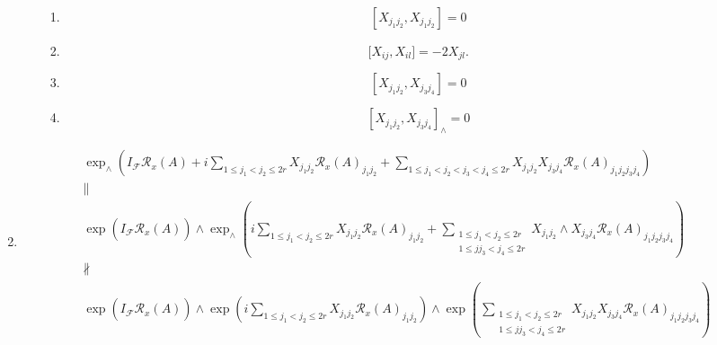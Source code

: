 \documentclass[aps,preprint]{revtex4}%
\begin{document}
\begin{enumerate}
\begin{enumerate}
\begin{enumerate}
\item
\[
\left[  X_{j_{1}j_{2}},X_{j_{1}j_{2}}\right]  =0
\]


\item
\begin{equation}
\lbrack X_{ij}{},X_{il{}}]=-2X_{jl}{}.
\end{equation}


\item
\[
\left[  X_{j_{1}j_{2}},X_{j_{3}j_{4}}\right]  =0
\]


\item
\[
\left[  X_{j_{1}j_{2}},X_{j_{3}j_{4}}\right]  _{\wedge}=0
\]

\end{enumerate}
\end{enumerate}

\item
\begin{gather}
\exp_{\wedge}\left(  I_{\mathcal{F}}\mathcal{R}_{x}\left(  A\right)
+i\sum_{1\leq j_{1}<j_{2}\leq2r}X_{j_{1}j_{2}}\mathcal{R}_{x}\left(  A\right)
_{j_{1}j_{2}}+\sum_{1\leq j_{1}<j_{2}<j_{3}<j_{4}\leq2r}X_{j_{1}j_{2}}%
X_{j_{3}j_{4}}\mathcal{R}_{x}\left(  A\right)  _{j_{1}j_{2}j_{3}j_{4}}\right)
\\
\parallel\\
\exp\left(  \overset{\overset{}{}}{I_{\mathcal{F}}\mathcal{R}_{x}\left(
A\right)  }\right)  \wedge\exp_{\wedge}\left(  i\sum_{1\leq j_{1}<j_{2}\leq
2r}X_{j_{1}j_{2}}\mathcal{R}_{x}\left(  A\right)  _{j_{1}j_{2}}+\sum
_{\substack{1\leq j_{1}<j_{2}\leq2r\\1\leq jj_{3}<j_{4}\leq2r}}X_{j_{1}j_{2}%
}\wedge X_{j_{3}j_{4}}\mathcal{R}_{x}\left(  A\right)  _{j_{1}j_{2}j_{3}j_{4}%
}\right) \\
\not \parallel \\
\exp\left(  \overset{\overset{}{}}{I_{\mathcal{F}}\mathcal{R}_{x}\left(
A\right)  }\right)  \wedge\exp\left(  i\sum_{1\leq j_{1}<j_{2}\leq2r}%
X_{j_{1}j_{2}}\mathcal{R}_{x}\left(  A\right)  _{j_{1}j_{2}}\right)
\wedge\exp\left(  \sum_{\substack{1\leq j_{1}<j_{2}\leq2r\\1\leq jj_{3}%
<j_{4}\leq2r}}X_{j_{1}j_{2}}X_{j_{3}j_{4}}\mathcal{R}_{x}\left(  A\right)
_{j_{1}j_{2}j_{3}j_{4}}\right)
\end{gather}

\end{enumerate}
\end{document}

